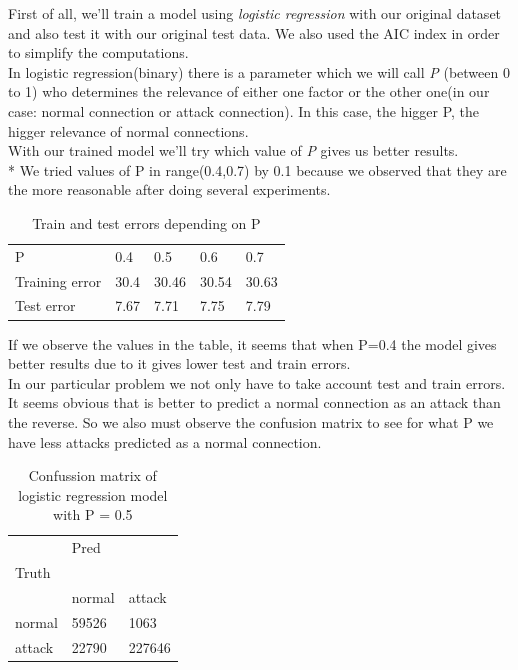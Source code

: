 \documentclass[a4paper]{article} %
\begin{document}
First of all, we'll train a model using \textit{logistic regression} with our original dataset and also test it with our original test data.
We also used the AIC index in order to simplify the computations.\\
In logistic regression(binary) there is a parameter which we will call \textit{P} (between 0 to 1) who determines the relevance of either one factor or the other one(in our case: normal connection or attack connection). In this case, the higger P, the higger relevance of normal connections. \\
With our trained model we'll try which value of \textit{P} gives us better results. \\
* We tried values of P in range(0.4,0.7) by 0.1 because we observed that they are the more reasonable after doing several experiments.
\begin{table}[h]
	\centering
	\caption{Train and test errors depending on P}
	\label{my-label}
	\begin{tabular}{lllll}
		P              & 0.4  & 0.5   & 0.6   & 0.7   \\
		Training error & 30.4 & 30.46 & 30.54 & 30.63 \\
		Test error     & 7.67 & 7.71  & 7.75  & 7.79 
	\end{tabular}
\end{table}

If we observe the values in the table, it seems that when P=0.4 the model gives better results due to it gives lower test and train errors. \\
In our particular problem we not only have to take account test and train errors. It seems obvious that is better to predict a normal connection as an attack than the reverse. So we also must observe the confusion matrix to see for what P we have less attacks predicted as a normal connection.

\begin{table}[h]
	\centering
	\caption{Confussion matrix of logistic regression model with P = 0.5}
	\label{my-label}
	\begin{tabular}{lll}
		& Pred   &        \\
		Truth  &        &        \\
		& normal & attack \\
		normal & 59526  & 1063   \\
		attack & 22790  & 227646
	\end{tabular}
\end{table}
\end{document}
